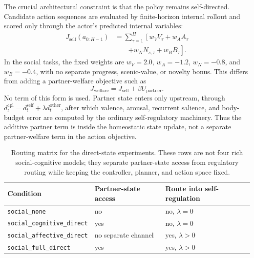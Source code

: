 \documentclass[letterpaper]{article}
\begin{document}
The crucial architectural constraint is that the policy remains self-directed. Candidate action sequences are evaluated by finite-horizon internal rollout and scored only through the actor's predicted internal variables:
\begin{equation}
\begin{aligned}
J_{\mathrm{self}}(a_{0:H-1})
&=
\sum_{\tau=1}^{H}
\left[
w_V V_\tau
+ w_A A_\tau \right.\\
&\qquad\left.
+ w_N N_{s,\tau}
+ w_B B_\tau
\right].
\end{aligned}
\label{eq:selfscore}
\end{equation}
In the social tasks, the fixed weights are $w_V=2.0$, $w_A=-1.2$, $w_N=-0.8$, and $w_B=-0.4$, with no separate progress, scenic-value, or novelty bonus.
This differs from adding a partner-welfare objective such as
\begin{equation}
J_{\mathrm{welfare}} =
J_{\mathrm{self}} + \beta U_{\mathrm{partner}} .
\label{eq:welfare}
\end{equation}
No term of this form is used. Partner state enters only upstream, through $d^{\mathrm{cpl}}_t=d^{\mathrm{self}}_t+\lambda d^{\mathrm{other}}_t$, after which valence, arousal, recurrent salience, and body-budget error are computed by the ordinary self-regulatory machinery. Thus the additive partner term is inside the homeostatic state update, not a separate partner-welfare term in the action objective.

\begin{table}[t]
\centering
\small
\begin{tabular}{@{}lll@{}}
\toprule
Condition & Partner-state access & Route into self-regulation \\
\midrule
\texttt{social\_none} & no & no, $\lambda=0$ \\
\texttt{social\_cognitive\_direct} & yes & no, $\lambda=0$ \\
\texttt{social\_affective\_direct} & no separate channel & yes, $\lambda>0$ \\
\texttt{social\_full\_direct} & yes & yes, $\lambda>0$ \\
\bottomrule
\end{tabular}
\caption{Routing matrix for the direct-state experiments. These rows are not four rich social-cognitive models; they separate partner-state access from regulatory routing while keeping the controller, planner, and action space fixed.}
\label{tab:conditions}
\end{table}
\end{document}
